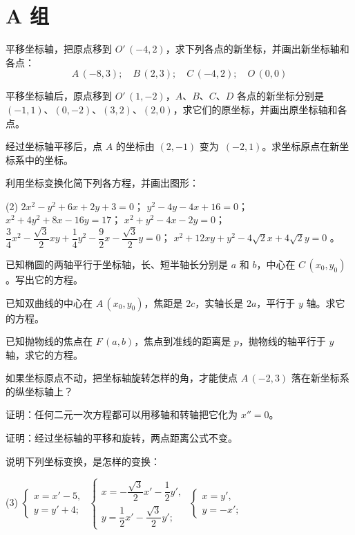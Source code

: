 \section*{A 组}
\begin{question}
  \item 平移坐标轴，把原点移到 $O'\,(-4,2)$，求下列各点的新坐标，并画出新坐标轴和各点：
  \[A\,(-8,3);\quad B\,(2,3);\quad C\,(-4,2);\quad O\,(0,0)\]
  \item 平移坐标轴后，原点移到 $O'\,(1,-2)$，$A$、$B$、$C$、$D$ 各点的新坐标分别是 $(-1,1)$、$(0,-2)$、$(3,2)$、$(2,0)$，求它们的原坐标，并画出原坐标轴和各点。
  \item 经过坐标轴平移后，点 $A$ 的坐标由 $(2,-1)$ 变为 $\,(-2,1)$。求坐标原点在新坐标系中的坐标。
  \item 利用坐标变换化简下列各方程，并画出图形：
  \begin{tasks}(2)
    \task $2x^2-y^2+6x+2y+3=0$；
    \task $y^2-4y-4x+16=0$；
    \task $x^2+4y^2+8x-16y=17$；
    \task $x^2+y^2-4x-2y=0$；
    \task $\dfrac{3}{4}x^2-\dfrac{\sqrt{3}}{2}{xy}+\dfrac{1}{4}y^2-\dfrac{9}{2}x-\dfrac{\sqrt{3}}{2}y=0$；
    \task $x^2+12xy+y^2 -4\sqrt{2}x+4\sqrt{2}y=0$ 。
  \end{tasks}
  \item 已知椭圆的两轴平行于坐标轴，长、短半轴长分别是 $a$ 和 $b$，中心在 $C\,(x_0,y_0)$。写出它的方程。
  \item 已知双曲线的中心在 $A\,(x_0,y_0)$，焦距是 $2c$，实轴长是 $2a$，平行于 $y$ 轴。求它的方程。
  \item 已知抛物线的焦点在 $F\,(a,b)$，焦点到准线的距离是 $p$，抛物线的轴平行于 $y$ 轴，求它的方程。
  \item 如果坐标原点不动，把坐标轴旋转怎样的角，才能使点 $A\,(-2,3)$ 落在新坐标系的纵坐标轴上？
  \item 证明：任何二元一次方程都可以用移轴和转轴把它化为 $x''= 0$。
  \item 证明：经过坐标轴的平移和旋转，两点距离公式不变。
  \item 说明下列坐标变换，是怎样的变换：
  \begin{tasks}(3)
    \task  $\begin{cases} x=x'-5,\\y=y'+4; \end{cases}$
    \task* $\begin{cases} x=-\dfrac{\sqrt{3}}{2}x'-\dfrac{1}{2}y',\\y=\dfrac{1}{2}x'-\dfrac{\sqrt{3}}{2}y'; \end{cases}$
    \task  $\begin{cases} x=y',\\y=-x'; \end{cases}$

\end{tasks}
\end{question}
